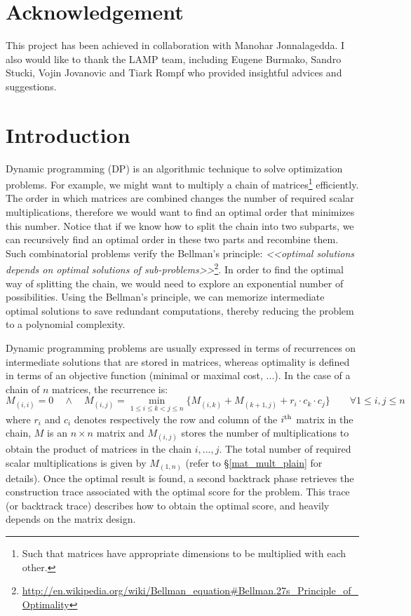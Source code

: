 \section*{Acknowledgement}
This project has been achieved in collaboration with Manohar Jonnalagedda. I also would like to thank the LAMP team, including Eugene Burmako, Sandro Stucki, Vojin Jovanovic and Tiark Rompf who provided insightful advices and suggestions.

\newpage
\setcounter{tocdepth}{2} \tableofcontents
\newpage
\section{Introduction} \label{intro}
Dynamic programming (DP) is an algorithmic technique to solve optimization problems. For example, we might want to multiply a chain of matrices\footnote{Such that matrices have appropriate dimensions to be multiplied with each other.} efficiently. The order in which matrices are combined changes the number of required scalar multiplications, therefore we would want to find an optimal order that minimizes this number. Notice that if we know how to split the chain into two subparts, we can recursively find an optimal order in these two parts and recombine them. Such combinatorial problems verify the Bellman's principle\cite{bellman_principle}: \textit{<<optimal solutions depends on optimal solutions of sub-problems>>}\footnote{\url{http://en.wikipedia.org/wiki/Bellman\_equation\#Bellman.27s\_Principle\_of\_Optimality}}. In order to find the optimal way of splitting the chain, we would need to explore an exponential number of possibilities. Using the Bellman's principle, we can memorize intermediate optimal solutions to save redundant computations, thereby reducing the problem to a polynomial complexity.

Dynamic programming problems are usually expressed in terms of recurrences on intermediate solutions that are stored in matrices, whereas optimality is defined in terms of an objective function (minimal or maximal cost, ...). In the case of a chain of $n$ matrices, the recurrence is:
	\[M_{(i,i)}=0 \quad\land\quad M_{(i,j)}=\min_{1\le i\le k<j\le n}\{M_{(i,k)}+M_{(k+1,j)}+r_i \cdot c_k \cdot c_j\} \qquad \forall 1\le i,j\le n\]
where $r_i$ and $c_i$ denotes respectively the row and column of the $i^{\rm th}$ matrix in the chain, $M$ is an $n \times n$ matrix and $M_{(i,j)}$ stores the number of multiplications to obtain the product of matrices in the chain $i,...,j$. The total number of required scalar multiplications is given by $M_{(1,n)}$ (refer to \S\ref{mat_mult_plain} for details). Once the optimal result is found, a second backtrack phase retrieves the construction trace associated with the optimal score for the problem. This trace (or backtrack trace) describes how to obtain the optimal score, and heavily depends on the matrix design.


